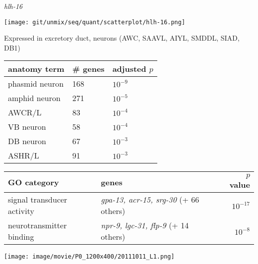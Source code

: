 \documentclass[serif,9pt]{beamer}
\begin{document}
\begin{frame}{{\em hlh-16}}

\begin{minipage}{0.4\textwidth}
\texttt{[image: git/unmix/seq/quant/scatterplot/hlh-16.png]}
\end{minipage}
\begin{minipage}{0.58\textwidth}
{\small Expressed in excretory duct,
neurons (AWC, SAAVL, AIYL, SMDDL, SIAD, DB1)}

\begin{table}[!tbp]\scriptsize
\begin{tabular}{lll}
anatomy term & \# genes & adjusted $p$ \\
\hline
phasmid neuron & 168 & $10^{-9}$ \\
amphid neuron & 271 & $10^{-5}$ \\
AWCR/L & 83 & $10^{-4}$ \\
VB neuron & 58 & $10^{-4}$ \\
DB neuron & 67 & $10^{-3}$ \\
ASHR/L & 91 & $10^{-3}$ \\
\hline

\end{tabular}
\end{table}
\end{minipage}

\begin{table}\footnotesize
\begin{tabular}{llr}
GO category & genes & $p$ value \\
\hline
signal transducer activity & {\em gpa-13, acr-15, srg-30} (+ 66 others) & $10^{-17}$ \\
neurotransmitter binding & {\em npr-9, lgc-31, flp-9} (+ 14 others) & $10^{-8}$ \\
\end{tabular}
\end{table}

\texttt{[image: image/movie/P0\_1200x400/20111011\_L1.png]}

\end{frame}
\end{document}
